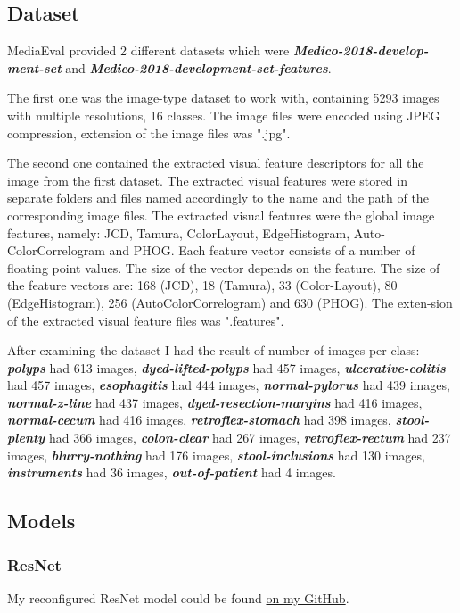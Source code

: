 \subsection{Dataset}
{MediaEval provided 2 different datasets which were \textbf{\emph{{Medico-2018-develop-ment-set}}} and \textbf{\emph{Medico-2018-development-set-features}}.

The first one was the image-type dataset to work with, containing 5293 images with multiple resolutions, 16 classes. The image files were encoded using JPEG compression\cite{jpeg}, extension of the image files was ".jpg". 

The second one contained the extracted visual feature descriptors for all the image from the first dataset. The extracted visual features were stored in separate folders and files named accordingly to the name and the path of the corresponding image files. The extracted visual features were the global image features, namely: JCD, Tamura, ColorLayout, EdgeHistogram, Auto-ColorCorrelogram and PHOG. Each feature vector consists of a number of floating point values. The size of the vector depends on the feature. The size of the feature vectors are: 168 (JCD), 18 (Tamura), 33 (Color-Layout), 80 (EdgeHistogram), 256 (AutoColorCorrelogram) and 630 (PHOG). The exten-sion of the extracted visual feature files was ".features".

After examining the dataset I had the result of number of images per class: \textbf{\emph{polyps}} had 613 images, \textbf{\emph{dyed-lifted-polyps}} had 457 images, \textbf{\emph{ulcerative-colitis}} had 457 images, \textbf{\emph{esophagitis}} had 444 images, \textbf{\emph{normal-pylorus}} had 439 images, \textbf{\emph{normal-z-line}} had 437 images, \textbf{\emph{dyed-resection-margins}} had 416 images, \textbf{\emph{normal-cecum}} had 416 images, \textbf{\emph{retroflex-stomach}} had 398 images, \textbf{\emph{stool-plenty}} had 366 images, \textbf{\emph{colon-clear}} had 267 images, \textbf{\emph{retroflex-rectum}} had 237 images, \textbf{\emph{blurry-nothing}} had 176 images, \textbf{\emph{stool-inclusions}} had 130 images, \textbf{\emph{instruments}} had 36 images, \textbf{\emph{out-of-patient}} had 4 images.

\subsection{Models}
\subsubsection{ResNet\cite{resnet}}
My reconfigured ResNet model could be found \href{https://github.com/tlvu2697/mediaeval-18--medico-multimedia}{on my GitHub}.

}

